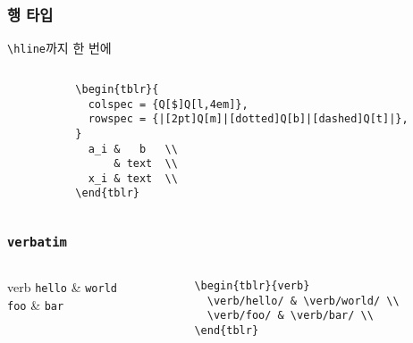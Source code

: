 \documentclass{beamer}
\newcommand*{\manual}[1]{\texttt{Tabularray}\footnote[2]{버전 2022A (2022-03-01)} 매뉴얼 \textbf{#1}}
\begin{document}
\begin{frame}[c,fragile]
  \frametitle{행 타입}

  \verb/\hline/까지 한 번에

  \begin{columns}
    \begin{column}{0.35\textwidth}
      \begin{center}
      \end{center}
    \end{column}

    \begin{column}{0.65\textwidth}
      \begin{lstlisting}
\begin{tblr}{
  colspec = {Q[$]Q[l,4em]},
  rowspec = {|[2pt]Q[m]|[dotted]Q[b]|[dashed]Q[t]|},
}
  a_i &   b   \\
      & text  \\
  x_i & text  \\
\end{tblr}
      \end{lstlisting}
    \end{column}
  \end{columns}
\end{frame}

\begin{frame}[c,fragile]
  \frametitle{\texttt{verbatim}}
  \begin{columns}
    \begin{column}{0.5\textwidth}
      \begin{center}
        \begin{tblr}{verb}
          \verb/hello/ & \verb/world/ \\
          \verb/foo/ & \verb/bar/ \\
        \end{tblr}
      \end{center}
    \end{column}

    \begin{column}{0.5\textwidth}
      \begin{lstlisting}
\begin{tblr}{verb}
  \verb/hello/ & \verb/world/ \\
  \verb/foo/ & \verb/bar/ \\
\end{tblr}
      \end{lstlisting}
    \end{column}
  \end{columns}
\end{frame}
\end{document}
